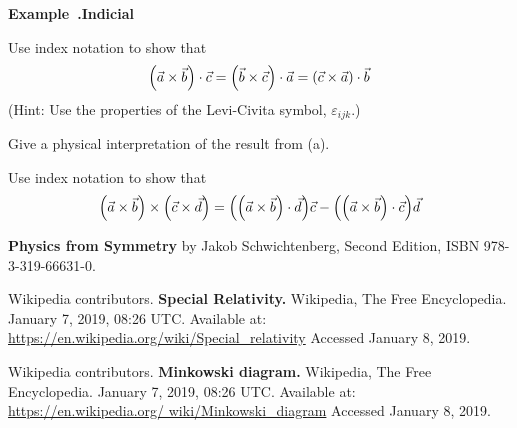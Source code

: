 \documentclass[12pt,oneside]{book}
\newcounter{example}[chapter]
\newenvironment{example}[2]{\noindent\refstepcounter{example}\par\medskip
	\noindent\textbf{Example~\thechapter.\theexample\quad #1} 
	\par\medskip\noindent#2
	\rmfamily}{\medskip}
\begin{document}
\begin{example}{Indicial}
{}
\begin{inparaenum}
\item   %
Use index notation to show that
$$
    \qty( \vec{a}\times\vec{b} )\cdot\vec{c}
    =
    \qty( \vec{b}\times\vec{c} )\cdot\vec{a}
    =
    \qty( \vec{c}\times\vec{a} )\cdot\vec{b}
$$
(Hint: Use the properties of the Levi-Civita symbol, $\varepsilon_{ijk}$.)
\item   %
Give a physical interpretation of the result from (a).
\item   %
Use index notation to show that
$$
    \qty( \vec{a}\times\vec{b} ) \times \qty( \vec{c}\times\vec{d} )
    =
    \qty( \qty( \vec{a}\times\vec{b} )\cdot\vec{d} ) \vec{c}
    -
    \qty( \qty( \vec{a}\times\vec{b} )\cdot\vec{c} ) \vec{d}
$$
\end{inparaenum}
\end{example}

\backmatter

\begin{thebibliography}{9}

{\bf Physics from Symmetry} by Jakob Schwichtenberg, Second Edition, ISBN 978-3-319-66631-0.

Wikipedia contributors. {\bf Special Relativity.} Wikipedia, The Free Encyclopedia. January 7, 2019, 08:26 UTC. 
Available at: \href{https://en.wikipedia.org/wiki/Special_relativity}{https://en.wikipedia.org/wiki/Special\_relativity}
Accessed January 8, 2019.

Wikipedia contributors. {\bf Minkowski diagram.} Wikipedia, The Free Encyclopedia. January 7, 2019, 08:26 UTC. 
Available at: \href{https://en.wikipedia.org/wiki/Minkowski_diagram}{https://en.wikipedia.org/ wiki/Minkowski\_diagram}
Accessed January 8, 2019.
   
\end{thebibliography}

\newpage
{}
\printindex
\end{document}
